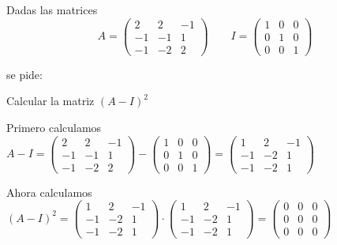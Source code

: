 \begin{ejemplo}
Dadas las matrices 
\[A=\begin{pmatrix}
	2&2&-1 \\
	-1&-1&1 \\
	-1&-2&2
\end{pmatrix}
\qquad
I=\begin{pmatrix}
	1&0&0 \\
	0&1&0 \\
	0&0&1
\end{pmatrix} \]

se pide:

 Calcular la matriz $(A-I)^2$

\tcblower

 Primero calculamos $A-I=\begin{pmatrix}
	2&2&-1 \\
	-1&-1&1 \\
	-1&-2&2
\end{pmatrix}
-\begin{pmatrix}
	1&0&0 \\
	0&1&0 \\
	0&0&1
\end{pmatrix}=
\begin{pmatrix}
	1 & 2 & -1 \\
	-1&-2&1 		\\
	-1&-2 & 1
\end{pmatrix} $ 

Ahora calculamos $(A-I)^2=\begin{pmatrix}
	1 & 2 & -1 \\
	-1&-2&1 		\\
	-1&-2 & 1
\end{pmatrix} \cdot\begin{pmatrix}
	1 & 2 & -1 \\
	-1&-2&1 		\\
	-1&-2 & 1
\end{pmatrix} =
\begin{pmatrix}
	0 & 0 & 0 \\
	0&0&0 		\\
	0&0 & 0
\end{pmatrix} $

\end{ejemplo}

